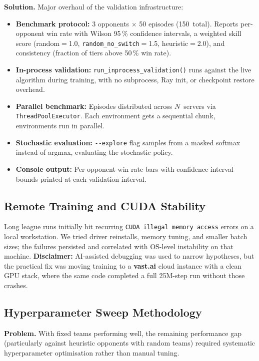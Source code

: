 \textbf{Solution.} Major overhaul of the validation infrastructure:
\begin{itemize}
  \item \textbf{Benchmark protocol:} 3 opponents $\times$ 50 episodes
        (150~total).  Reports per-opponent win rate with Wilson 95\,\%
        confidence intervals, a weighted skill score (random$=$1.0,
        \texttt{random\_no\_switch}$=$1.5, heuristic$=$2.0), and consistency
        (fraction of tiers above 50\,\% win rate).
  \item \textbf{In-process validation:} \texttt{run\_inprocess\_validation()}
        runs against the live algorithm during training, with no subprocess,
        Ray init, or checkpoint restore overhead.
  \item \textbf{Parallel benchmark:} Episodes distributed across $N$~servers
        via \texttt{ThreadPoolExecutor}.  Each environment gets a sequential
        chunk, environments run in parallel.
  \item \textbf{Stochastic evaluation:} \texttt{-{}-explore} flag samples
        from a masked softmax instead of argmax, evaluating the stochastic
        policy.
  \item \textbf{Console output:} Per-opponent win rate bars with confidence
        interval bounds printed at each validation interval.
\end{itemize}

\subsection{Remote Training and CUDA Stability}

Long league runs initially hit recurring \texttt{CUDA illegal memory access}
errors on a local workstation.  We tried driver reinstalls, memory tuning, and
smaller batch sizes; the failures persisted and correlated with OS-level
instability on that machine.  \textbf{Disclaimer:} AI-assisted debugging was
used to narrow hypotheses, but the practical fix was moving training to a
\textbf{vast.ai} cloud instance with a clean GPU stack, where the same code
completed a full 25M-step run without those crashes.

\subsection{Hyperparameter Sweep Methodology}

\textbf{Problem.} With fixed teams performing well, the remaining performance
gap (particularly against heuristic opponents with random teams) required
systematic hyperparameter optimisation rather than manual tuning.

